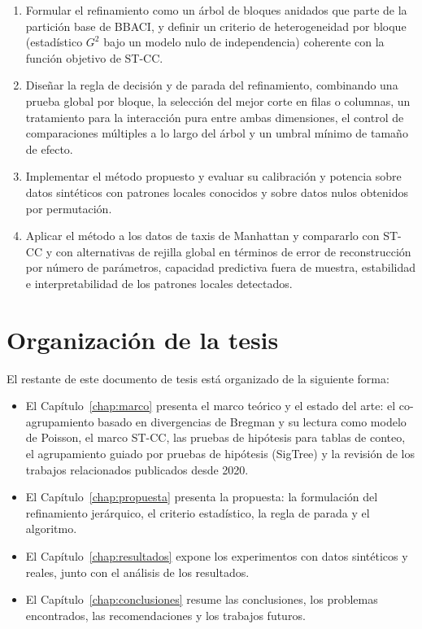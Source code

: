 \begin{enumerate}
    \item Formular el refinamiento como un árbol de bloques anidados que
          parte de la partición base de \ac{BBACI}, y definir un criterio
          de heterogeneidad por bloque (estadístico $G^2$ bajo un modelo
          nulo de independencia) coherente con la función objetivo de
          \ac{ST-CC}.

    \item Diseñar la regla de decisión y de parada del refinamiento,
          combinando una prueba global por bloque, la selección del mejor
          corte en filas o columnas, un tratamiento para la interacción pura
          entre ambas dimensiones, el control de comparaciones múltiples a
          lo largo del árbol y un umbral mínimo de tamaño de efecto.

    \item Implementar el método propuesto y evaluar su calibración y
          potencia sobre datos sintéticos con patrones locales conocidos y
          sobre datos nulos obtenidos por permutación.

    \item Aplicar el método a los datos de taxis de Manhattan y compararlo
          con \ac{ST-CC} y con alternativas de rejilla global en términos
          de error de reconstrucción por número de parámetros, capacidad
          predictiva fuera de muestra, estabilidad e interpretabilidad de
          los patrones locales detectados.
\end{enumerate}

\section{Organización de la tesis}
\label{sec:organizacion}

El restante de este documento de tesis está organizado de la siguiente
forma:

\begin{itemize}
    \item El Capítulo~\ref{chap:marco} presenta el marco teórico y el estado
          del arte: el co-agrupamiento basado en divergencias de Bregman y su
          lectura como modelo de Poisson, el marco \ac{ST-CC}, las pruebas de
          hipótesis para tablas de conteo, el agrupamiento guiado por pruebas
          de hipótesis (SigTree) y la revisión de los trabajos relacionados
          publicados desde 2020.
    \item El Capítulo~\ref{chap:propuesta} presenta la propuesta: la
          formulación del refinamiento jerárquico, el criterio estadístico,
          la regla de parada y el algoritmo.
    \item El Capítulo~\ref{chap:resultados} expone los experimentos con
          datos sintéticos y reales, junto con el análisis de los
          resultados.
    \item El Capítulo~\ref{chap:conclusiones} resume las conclusiones, los
          problemas encontrados, las recomendaciones y los trabajos futuros.
\end{itemize}

